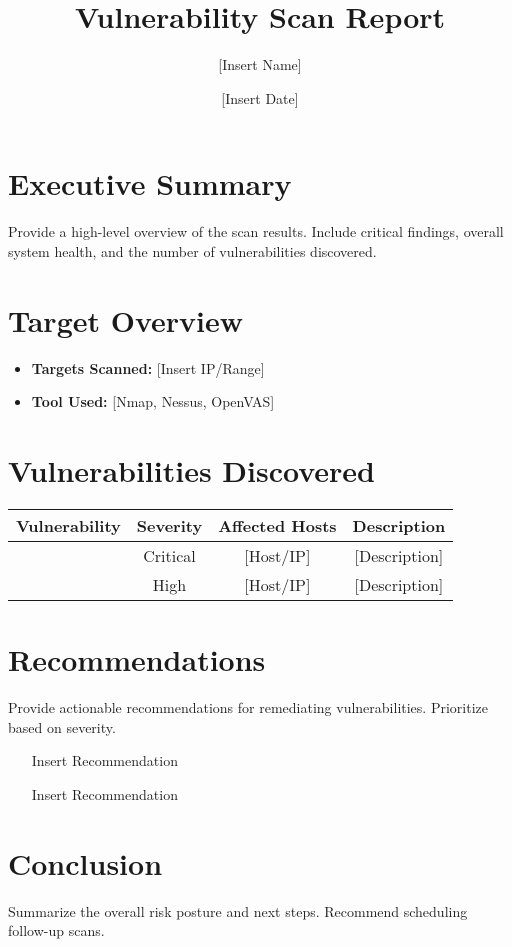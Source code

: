 \documentclass{article}
\title{Vulnerability Scan Report}
\author{[Insert Name]}
\date{[Insert Date]}
\begin{document}
\maketitle

\section{Executive Summary}
Provide a high-level overview of the scan results. Include critical findings, overall system health, and the number of vulnerabilities discovered.

\section{Target Overview}
\begin{itemize}
  \item \textbf{Targets Scanned:} [Insert IP/Range]
  \item \textbf{Tool Used:} [Nmap, Nessus, OpenVAS]
\end{itemize}

\section{Vulnerabilities Discovered}
\begin{tabular}{|c|c|c|c|}
  \hline
  Vulnerability & Severity & Affected Hosts & Description \\
  \hline
  [Vuln Name] & Critical & [Host/IP] & [Description] \\
  [Vuln Name] & High     & [Host/IP] & [Description] \\
  \hline
\end{tabular}

\section{Recommendations}
Provide actionable recommendations for remediating vulnerabilities. Prioritize based on severity.

\begin{itemize}
  \item [Insert Recommendation]
  \item [Insert Recommendation]
\end{itemize}

\section{Conclusion}
Summarize the overall risk posture and next steps. Recommend scheduling follow-up scans.
\end{document}

